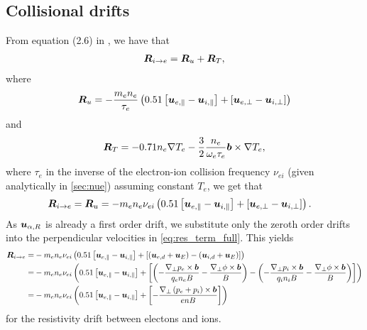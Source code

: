 \subsection{Collisional drifts}
%
From equation (2.6) in \cite{Braginskii1965}, we have that
%
\begin{align*}
    \boldsymbol{R}_{i \to e}
    =
    \boldsymbol{R}_{u} + \boldsymbol{R}_{T},
\end{align*}
%
where
%
\begin{align*}
    \boldsymbol{R}_{u}
    =
    -\frac{m_en_e}{\tau_e}\left(0.51\left[\boldsymbol{u}_{e,\|}-\boldsymbol{u}_{i,\|}\right] +
    \left[\boldsymbol{u}_{e,\perp}-\boldsymbol{u}_{i,\perp}\right]\right)
\end{align*}
%
and
%
\begin{align*}
    \boldsymbol{R}_{T}
    =
    -0.71n_e\nabla T_e -
    \frac{3}{2}\frac{n_e}{\omega_e\tau_e}\boldsymbol{b}\times\nabla T_e,
\end{align*}
%
where $\tau_e$ in the inverse of the electron-ion collision frequency $\nu_{ei}$ (given analytically in \cref{sec:nue}) assuming constant $T_e$, we get that
%
\begin{align}
    \boldsymbol{R}_{i \to e}
    = \boldsymbol{R}_{u}
   &= -m_en_e\nu_{ei}\left(0.51\left[\boldsymbol{u}_{e,\|}-\boldsymbol{u}_{i,\|}\right] +
      \left[\boldsymbol{u}_{e,\perp}-\boldsymbol{u}_{i,\perp}\right]\right).
   \label{eq:res_term_full}
\end{align}
%
As $\boldsymbol{u}_{\alpha,R}$ is already a first order drift, we substitute only the zeroth order drifts into the perpendicular velocities in \cref{eq:res_term_full}.
This yields
%
\begin{align*}
    \ve{R}_{i \to e}
    =&
    -m_en_e\nu_{ei}
   \L( 0.51 \L[\ve{u}_{e,\|}-\ve{u}_{i,\|}\R] +
      \L[
         \L(
           \ve{u}_{e,d} + \ve{u}_E
          \R)
          -
         \L(
          \ve{u}_{i,d} + \ve{u}_E
         \R)
      \R]
   \R)
   \\
%
%
   =&
   -m_en_e\nu_{ei}
   \L( 0.51 \L[\ve{u}_{e,\|}-\ve{u}_{i,\|}\R] +
      \L[
         \L(
            -
            \frac{\grad_\perp p_e \times \ve{b}}{q_en_eB}
            -
            \frac{\grad_\perp \phi \times \ve{b}}{B}
          \R)
          -
         \L(
            -
            \frac{\grad_\perp p_i \times \ve{b}}{q_in_iB}
            -
          \frac{\grad_\perp \phi \times \ve{b}}{B}
         \R)
      \R]
   \R)
   \\
%
%
   =&
   -m_en_e\nu_{ei}
   \L(0.51\L[\ve{u}_{e,\|}-\ve{u}_{i,\|}\R] +
      \L[
            -
            \frac{\grad_\perp \L(p_e + p_i\R) \times \ve{b}}{enB}
      \R]
  \R)
\end{align*}
%
for the resistivity drift between electons and ions.

